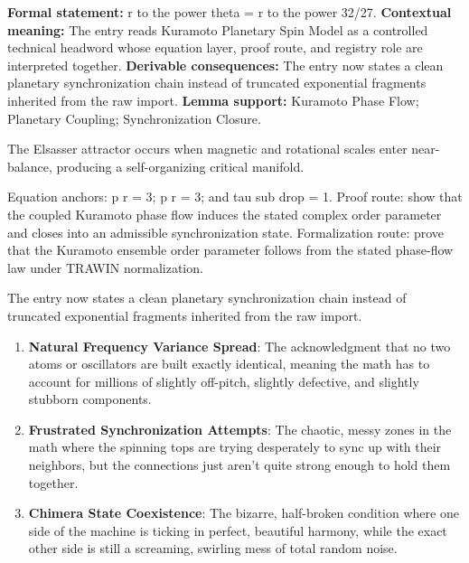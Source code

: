 \begingroup\footnotesize\setlength{\emergencystretch}{3em}\sloppy
\textbf{Formal statement:} r to the power theta = r to the power 32/27. \textbf{Contextual meaning:} The entry reads Kuramoto Planetary Spin Model as a controlled technical headword whose equation layer, proof route, and registry role are interpreted together. \textbf{Derivable consequences:} The entry now states a clean planetary synchronization chain instead of truncated exponential fragments inherited from the raw import. \textbf{Lemma support:} Kuramoto Phase Flow; Planetary Coupling; Synchronization Closure.\par
\endgroup

The Elsasser attractor occurs when magnetic and rotational scales enter near-balance, producing a self-organizing critical manifold.

Equation anchors: p r = 3; p r = 3; and tau sub drop = 1. Proof route: show that the coupled Kuramoto phase flow induces the stated complex order parameter and closes into an admissible synchronization state. Formalization route: prove that the Kuramoto ensemble order parameter follows from the stated phase-flow law under TRAWIN normalization.

The entry now states a clean planetary synchronization chain instead of truncated exponential fragments inherited from the raw import.
\endgroup

\begin{enumerate}[leftmargin=1.6em,itemsep=6pt,topsep=4pt]
\item \textbf{Natural Frequency Variance Spread}: The acknowledgment that no two atoms or oscillators are built exactly identical, meaning the math has to account for millions of slightly off-pitch, slightly defective, and slightly stubborn components.
\item \textbf{Frustrated Synchronization Attempts}: The chaotic, messy zones in the math where the spinning tops are trying desperately to sync up with their neighbors, but the connections just aren't quite strong enough to hold them together.
\item \textbf{Chimera State Coexistence}: The bizarre, half-broken condition where one side of the machine is ticking in perfect, beautiful harmony, while the exact other side is still a screaming, swirling mess of total random noise.
\end{enumerate}

